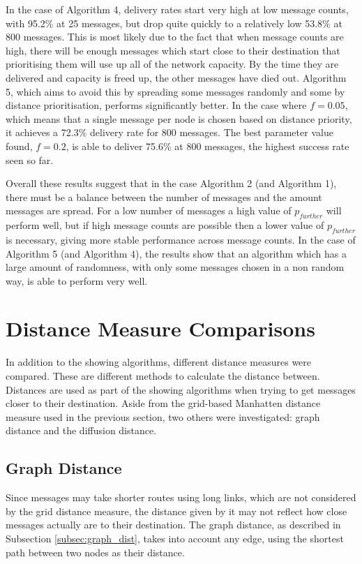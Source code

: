 \documentclass[bsc,frontabs,twoside,singlespacing,parskip,deptreport]{infthesis}     %
\begin{document}
In the case of Algorithm 4, delivery rates start very high at low message counts, with 95.2\% at 25 messages, but drop quite quickly to a relatively low 53.8\% at 800 messages. This is most likely due to the fact that when message counts are high, there will be enough messages which start close to their destination that prioritising them will use up all of the network capacity. By the time they are delivered and capacity is freed up, the other messages have died out. Algorithm 5, which aims to avoid this by spreading some messages randomly and some by distance prioritisation, performs significantly better. In the case where $f=0.05$, which means that a single message per node is chosen based on distance priority, it achieves a 72.3\% delivery rate for 800 messages. The best parameter value found, $f=0.2$, is able to deliver 75.6\% at 800 messages, the highest success rate seen so far.

Overall these results suggest that in the case Algorithm 2 (and Algorithm 1), there must be a balance between the number of messages and the amount messages are spread. For a low number of messages a high value of $p_{further}$ will perform well, but if high message counts are possible then a lower value of $p_{further}$ is necessary, giving more stable performance across message counts. In the case of Algorithm 5 (and Algorithm 4), the results show that an algorithm which has a large amount of randomness, with only some messages chosen in a non random way, is able to perform very well.

\section{Distance Measure Comparisons}
In addition to the showing algorithms, different distance measures were compared. These are different methods to calculate the distance between. Distances are used as part of the showing algorithms when trying to get messages closer to their destination. Aside from the grid-based Manhatten distance measure used in the previous section, two others were investigated: graph distance and the diffusion distance.

\subsection{Graph Distance}
Since messages may take shorter routes using long links, which are not considered by the grid distance measure, the distance given by it may not reflect how close messages actually are to their destination. The graph distance, as described in Subsection \ref{subsec:graph_dist}, takes into account any edge, using the shortest path between two nodes as their distance.
\end{document}
